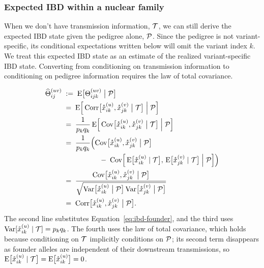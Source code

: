 \documentclass[12pt]{article}
\numberwithin{equation}{section}
\begin{document}
\subsubsection{Expected IBD within a nuclear family}

When we don't have transmission information, $\mathcal{T}$, we can still derive the expected IBD state given the pedigree alone, $\mathcal{P}$.
Since the pedigree is not variant-specific, its conditional expectations written below will omit the variant index $k$.
We treat this expected IBD state as an estimate of the realized variant-specific IBD state.
Converting from conditioning on transmission information to conditioning on pedigree information requires the law of total covariance.

\begin{equation}\label{eq:allele-kinship}
\begin{aligned}
    \widehat\Theta^{(uv)}_{ij}
    \;&:=\; \mathrm{E}\big[\Theta^{(uv)}_{ijk} \;\big|\; \mathcal{P}\big] \\
    \;&=\; \mathrm{E}\Big[\, \mathrm{Corr}\big[\mathring{x}_{ik}^{(u)}, \mathring{x}_{jk}^{(v)} \;\big|\; \mathcal{T}\big] \;\Big|\; \mathcal{P} \Big] \\
    \;&=\; \frac{1}{p_k q_k}\, \mathrm{E}\Big[\, \mathrm{Cov}\big[\mathring{x}_{ik}^{(u)}, \mathring{x}_{jk}^{(v)} \;\big|\; \mathcal{T}\big] \;\Big|\; \mathcal{P} \Big] \\
    \;&=\; \frac{1}{p_k q_k} \Big( \mathrm{Cov}\big[\mathring{x}_{ik}^{(u)}, \mathring{x}_{jk}^{(v)} \;\big|\; \mathcal{P}\big] \\
    &\qquad\qquad\quad -\; \mathrm{Cov}\Big[\, \mathrm{E}\big[\mathring{x}_{ik}^{(u)} \mid \mathcal{T}\big],\, \mathrm{E}\big[\mathring{x}_{jk}^{(v)} \mid \mathcal{T}\big] \;\Big|\; \mathcal{P} \Big] \Big) \\
    \;&=\; \frac{\mathrm{Cov}\big[\mathring{x}_{ik}^{(u)}, \mathring{x}_{jk}^{(v)} \;\big|\; \mathcal{P}\big]}{\sqrt{\mathrm{Var}\big[\mathring{x}_{ik}^{(u)} \;\big|\; \mathcal{P}\big]\, \mathrm{Var}\big[\mathring{x}_{jk}^{(v)} \;\big|\; \mathcal{P}\big]}} \\
    \;&=\; \mathrm{Corr}\big[\mathring{x}_{ik}^{(u)}, \mathring{x}_{jk}^{(v)} \;\big|\; \mathcal{P}\big] .
\end{aligned}
\end{equation}
The second line substitutes Equation~\eqref{eq:ibd-founder}, and the third uses $\mathrm{Var}[\mathring{x}^{(u)}_{ik} \mid \mathcal{T}] = p_k q_k$.
The fourth uses the law of total covariance, which holds because conditioning on $\mathcal{T}$ implicitly conditions on $\mathcal{P}$;
its second term disappears as founder alleles are independent of their downstream transmissions, so $\mathrm{E}\big[\mathring{x}_{ik}^{(u)} \mid \mathcal{T}\big] = \mathrm{E}\big[\mathring{x}_{ik}^{(u)}\big] = 0$.
\end{document}
